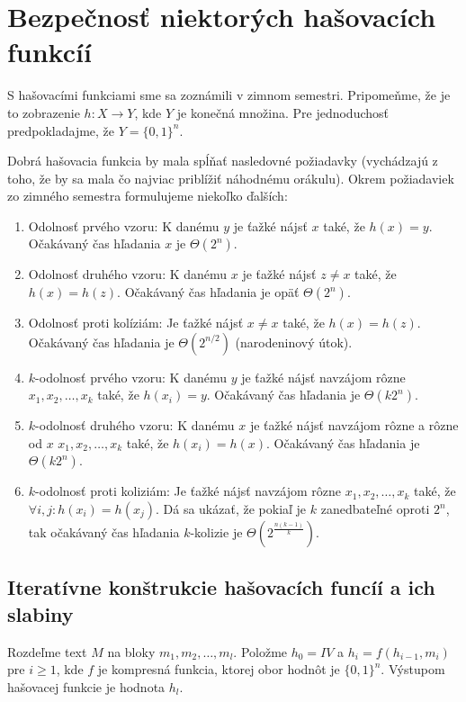 \section{Bezpečnosť niektorých hašovacích funkcíí}

S hašovacími funkciami sme sa zoznámili v zimnom semestri.
Pripomeňme, že je to zobrazenie $h: X \to Y$, kde $Y$ je konečná množina.
Pre jednoduchosť predpokladajme, že $Y = \{0,1\}^n$. 

Dobrá hašovacia funkcia by mala spĺňať nasledovné požiadavky (vychádzajú z toho, že by sa
mala čo najviac priblížiť náhodnému orákulu). Okrem požiadaviek zo zimného semestra formulujeme niekoľko ďalších:
\begin{enumerate}
\item Odolnosť prvého vzoru: K danému $y$ je ťažké nájsť $x$ také, že $h(x) = y$. Očakávaný čas hľadania $x$ je $\Theta(2^n)$.
\item Odolnosť druhého vzoru: K danému $x$ je ťažké nájsť $z \neq x$ také, že $h(x) = h(z)$. Očakávaný čas hľadania je opäť
$\Theta(2^n)$.
\item Odolnosť proti kolíziám: Je ťažké nájsť $x \neq x$ také, že $h(x) = h(z)$. Očakávaný čas hľadania je $\Theta(2^{n/2})$ (narodeninový útok).
\item $k$-odolnosť prvého vzoru: K danému $y$ je ťažké nájsť navzájom rôzne $x_1, x_2, \dots, x_k$ také, že $h(x_i) = y$. Očakávaný čas hľadania
je $\Theta(k 2^n)$.
\item $k$-odolnosť druhého vzoru: K danému $x$ je ťažké nájsť navzájom rôzne a rôzne od $x$ $x_1, x_2, \dots, x_k$ také, že $h(x_i) = h(x)$.
Očakávaný čas hľadania je $\Theta(k 2^n)$.
\item $k$-odolnosť proti koliziám: Je ťažké nájsť navzájom rôzne $x_1, x_2, \dots, x_k$ také, že $\forall i, j\colon h(x_i) = h(x_j)$. 
Dá sa ukázať, že pokiaľ je $k$ zanedbateľné oproti $2^n$, tak očakávaný čas hľadania $k$-kolizie je $\Theta(2^{\frac{n(k-1)}{k}})$.
\end{enumerate}

\subsection {Iteratívne konštrukcie hašovacích funcíí a ich slabiny}

Rozdeľme text $M$ na bloky $m_1, m_2, \dots, m_l$.
Položme $h_0 = IV$ a $h_i = f(h_{i-1}, m_i)$ pre $i \geq 1$, kde $f$ je kompresná funkcia, ktorej obor hodnôt je $\{0,1\}^n$.
Výstupom hašovacej funkcie je hodnota $h_l$.

